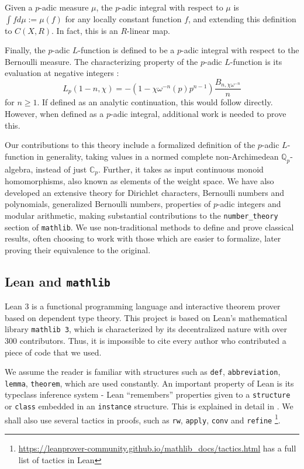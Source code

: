 \documentclass[a4paper,UKenglish,cleveref, autoref, thm-restate]{lipics-v2021}
\newcommand{\lean}[1]{\texttt{#1}\xspace} %
\begin{document}
Given a $p$-adic measure $\mu$, the $p$-adic integral with respect to $\mu$ is 
$\int f d\mu := \mu (f)$ for any locally constant function $f$, and 
extending this definition to $C(X, R)$. In fact, this is an $R$-linear map. 

Finally, the $p$-adic $L$-function is defined to be a $p$-adic integral with respect to the Bernoulli 
measure. The characterizing property of the $p$-adic $L$-function is its evaluation at negative integers : 
$$ L_p (1 - n, \chi) = -(1 - \chi \omega^{-n}(p)p^{n - 1}) \frac{B_{n, \chi \omega^{-n}}}{n} $$
for $n \ge 1$. If defined as an analytic continuation, this would follow directly. However, when 
defined as a $p$-adic integral, additional work is needed to prove this. 

Our contributions to this theory include a formalized definition of the $p$-adic $L$-function in generality, 
taking values in a normed complete non-Archimedean $\mathbb{Q}_p$-algebra, instead of just $\mathbb{C}_p$. Further, it takes as 
input continuous monoid homomorphisms, also known as elements of the weight space. We have also developed an extensive theory for 
Dirichlet characters, Bernoulli numbers and polynomials, generalized Bernoulli numbers, properties of $p$-adic integers and modular arithmetic, 
making substantial contributions to the \lean{number\_theory} section of \lean{mathlib}. 
We use non-traditional methods to define and prove classical results, often choosing to work with those which are easier to formalize, 
later proving their equivalence to the original. 

\subsection{Lean and \lean{mathlib}}
Lean 3 is a functional programming language and interactive theorem prover based on
dependent type theory. This project is based on Lean’s 
mathematical library \lean{mathlib 3}, which is characterized by
its decentralized nature with over 300 contributors. Thus, it is impossible to cite every author who contributed a piece of code that we used.

We assume the reader is familiar with structures such as \lean{def}, \lean{abbreviation}, \lean{lemma}, \lean{theorem}, which are used constantly. 
An important property of Lean is its typeclass inference system - 
Lean ``remembers'' properties given to a \lean{structure} or \lean{class} embedded in an \lean{instance} structure. This is explained in detail in \cite{mathlib}. 
We shall also use several tactics in proofs, such as \lean{rw}, \lean{apply}, \lean{conv} and \lean{refine}
\footnote{\url{https://leanprover-community.github.io/mathlib_docs/tactics.html} has a full list of tactics in Lean}.
\end{document}
